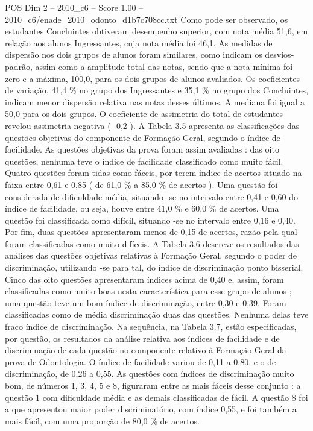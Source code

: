 \begin{textsample}{POS Dim 2 – 2010\_c6 – Score 1.00 – 2010\_c6/enade\_2010\_odonto\_d1b7c708cc.txt}
Como pode ser observado, os estudantes Concluintes obtiveram desempenho superior, com nota média 51,6, em relação aos alunos Ingressantes, cuja nota média foi 46,1.
As medidas de dispersão nos dois grupos de alunos foram similares, como indicam os desvios-padrão, assim como a amplitude total das notas, sendo que a nota mínima foi zero e a máxima, 100,0, para os dois grupos de alunos avaliados.
Os coeficientes de variação, 41,4 \% no grupo dos Ingressantes e 35,1 \% no grupo dos Concluintes, indicam menor dispersão relativa nas notas desses últimos.
A mediana foi igual a 50,0 para os dois grupos.
O coeficiente de assimetria do total de estudantes revelou assimetria negativa ( -0,2 ).
A Tabela 3.5 apresenta as classificações das questões objetivas do componente de Formação Geral, segundo o índice de facilidade.
As questões objetivas da prova foram assim avaliadas : das oito questões, nenhuma teve o índice de facilidade classificado como muito fácil.
Quatro questões foram tidas como fáceis, por terem índice de acertos situado na faixa entre 0,61 e 0,85 ( de 61,0 \% a 85,0 \% de acertos ).
Uma questão foi considerada de dificuldade média, situando -se no intervalo entre 0,41 e 0,60 do índice de facilidade, ou seja, houve entre 41,0 \% e 60,0 \% de acertos.
Uma questão foi classificada como difícil, situando -se no intervalo entre 0,16 e 0,40.
Por fim, duas questões apresentaram menos de 0,15 de acertos, razão pela qual foram classificadas como muito difíceis.
A Tabela 3.6 descreve os resultados das análises das questões objetivas relativas à Formação Geral, segundo o poder de discriminação, utilizando -se para tal, do índice de discriminação ponto bisserial.
Cinco das oito questões apresentaram índices acima de 0,40 e, assim, foram classificadas como muito boas nesta característica para esse grupo de alunos ; uma questão teve um bom índice de discriminação, entre 0,30 e 0,39.
Foram classificadas como de média discriminação duas das questões.
Nenhuma delas teve fraco índice de discriminação.
Na sequência, na Tabela 3.7, estão especificadas, por questão, os resultados da análise relativa aos índices de facilidade e de discriminação de cada questão no componente relativo à Formação Geral da prova de Odontologia.
O índice de facilidade variou de 0,11 a 0,80, e o de discriminação, de 0,26 a 0,55.
As questões com índices de discriminação muito bom, de números 1, 3, 4, 5 e 8, figuraram entre as mais fáceis desse conjunto : a questão 1 com dificuldade média e as demais classificadas de fácil.
A questão 8 foi a que apresentou maior poder discriminatório, com índice 0,55, e foi também a mais fácil, com uma proporção de 80,0 \% de acertos.

\end{textsample}

